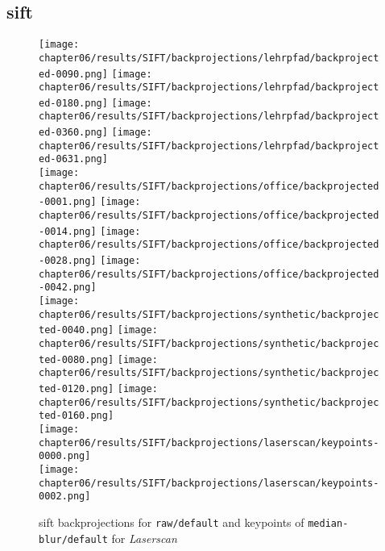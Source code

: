 \subsection{\acrshort{sift}}\label{sec:backprojection_sift}
\begin{figure}[H]
    \texttt{[image: chapter06/results/SIFT/backprojections/lehrpfad/backprojected-0090.png]}%
    \texttt{[image: chapter06/results/SIFT/backprojections/lehrpfad/backprojected-0180.png]}%
    \texttt{[image: chapter06/results/SIFT/backprojections/lehrpfad/backprojected-0360.png]}%
    \texttt{[image: chapter06/results/SIFT/backprojections/lehrpfad/backprojected-0631.png]}\\
    \texttt{[image: chapter06/results/SIFT/backprojections/office/backprojected-0001.png]}%
    \texttt{[image: chapter06/results/SIFT/backprojections/office/backprojected-0014.png]}%
    \texttt{[image: chapter06/results/SIFT/backprojections/office/backprojected-0028.png]}%
    \texttt{[image: chapter06/results/SIFT/backprojections/office/backprojected-0042.png]}\\
    \texttt{[image: chapter06/results/SIFT/backprojections/synthetic/backprojected-0040.png]}%
    \texttt{[image: chapter06/results/SIFT/backprojections/synthetic/backprojected-0080.png]}%
    \texttt{[image: chapter06/results/SIFT/backprojections/synthetic/backprojected-0120.png]}%
    \texttt{[image: chapter06/results/SIFT/backprojections/synthetic/backprojected-0160.png]}\\
    \texttt{[image: chapter06/results/SIFT/backprojections/laserscan/keypoints-0000.png]}\\
    \texttt{[image: chapter06/results/SIFT/backprojections/laserscan/keypoints-0002.png]}\\
    \caption[\acrshort{sift} backprojections and keypoints]{\acrshort{sift} backprojections for \texttt{raw/default} and keypoints of \texttt{median-blur/default} for \emph{Laserscan}}
\end{figure}
